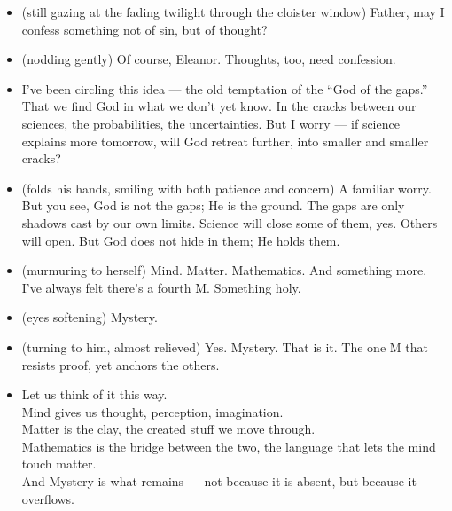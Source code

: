 \begin{itemize}[leftmargin=2cm,labelsep=1em]
    \item[\textbf{Eleanor:}] (still gazing at the fading twilight through the cloister window)  
    Father, may I confess something not of sin, but of thought?

    \item[\textbf{Priest:}] (nodding gently)  
    Of course, Eleanor. Thoughts, too, need confession.

    \item[\textbf{Eleanor:}]  
    I’ve been circling this idea --- the old temptation of the ``God of the gaps.''  
    That we find God in what we don’t yet know.  
    In the cracks between our sciences, the probabilities, the uncertainties.  
    But I worry --- if science explains more tomorrow, will God retreat further, into smaller and smaller cracks?

    \item[\textbf{Priest:}] (folds his hands, smiling with both patience and concern)  
    A familiar worry. But you see, God is not the gaps; He is the ground.  
    The gaps are only shadows cast by our own limits.  
    Science will close some of them, yes. Others will open.  
    But God does not hide in them; He holds them.

    \item[\textbf{Eleanor:}] (murmuring to herself)  
    Mind. Matter. Mathematics. And something more.  
    I’ve always felt there’s a fourth M. Something holy.

    \item[\textbf{Priest:}] (eyes softening)  
    Mystery.

    \item[\textbf{Eleanor:}] (turning to him, almost relieved)  
    Yes. Mystery. That is it.  
    The one M that resists proof, yet anchors the others.

    \item[\textbf{Priest:}]  
    Let us think of it this way. \\   
    Mind gives us thought, perception, imagination. \\   
    Matter is the clay, the created stuff we move through. \\   
    Mathematics is the bridge between the two,  
    the language that lets the mind touch matter. \\   
    And Mystery is what remains --- not because it is absent,  
    but because it overflows.


\end{itemize}
